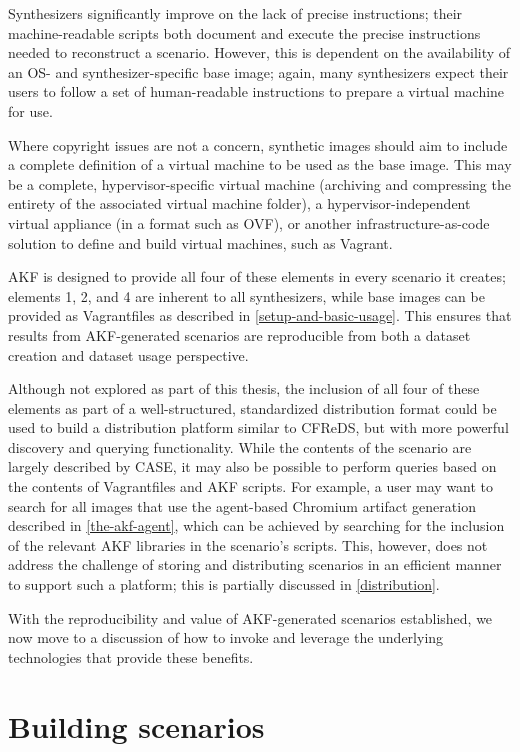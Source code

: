 \documentclass[letterpaper,12pt]{report}
\begin{document}
Synthesizers significantly improve on the lack of precise instructions;
their machine-readable scripts both document and execute the precise
instructions needed to reconstruct a scenario. However, this is
dependent on the availability of an OS- and synthesizer-specific base
image; again, many synthesizers expect their users to follow a set of
human-readable instructions to prepare a virtual machine for use.

Where copyright issues are not a concern, synthetic images should aim to
include a complete definition of a virtual machine to be used as the
base image. This may be a complete, hypervisor-specific virtual machine
(archiving and compressing the entirety of the associated virtual
machine folder), a hypervisor-independent virtual appliance (in a format
such as OVF), or another infrastructure-as-code solution to define and
build virtual machines, such as Vagrant.

AKF is designed to provide all four of these elements in every scenario
it creates; elements 1, 2, and 4 are inherent to all synthesizers, while
base images can be provided as Vagrantfiles as described in \autoref{setup-and-basic-usage}. This ensures that
results from AKF-generated scenarios are reproducible from both a
dataset creation and dataset usage perspective.

Although not explored as part of this thesis, the inclusion of all four
of these elements as part of a well-structured, standardized
distribution format could be used to build a distribution platform
similar to CFReDS, but with more powerful discovery and querying
functionality. While the contents of the scenario are largely described
by CASE, it may also be possible to perform queries based on the
contents of Vagrantfiles and AKF scripts. For example, a user may want
to search for all images that use the agent-based Chromium artifact
generation described in \autoref{the-akf-agent}, which can be achieved by searching for the inclusion of the
relevant AKF libraries in the scenario's scripts. This, however, does
not address the challenge of storing and distributing scenarios in an
efficient manner to support such a platform; this is partially discussed
in \autoref{distribution}.

With the reproducibility and value of AKF-generated scenarios
established, we now move to a discussion of how to invoke and leverage
the underlying technologies that provide these benefits.

\chapter{Building scenarios}\label{chapter-six}
\end{document}
